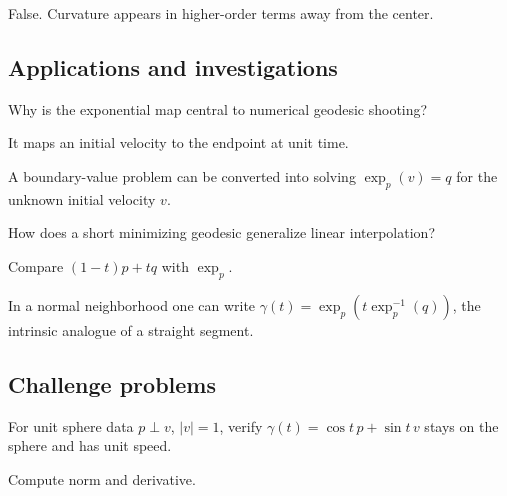 \begin{solution}
False.  Curvature appears in higher-order terms away from the center.
\end{solution}

\subsection*{Applications and investigations}

\begin{exercise}\label{exr:vii23-ped-13}
Why is the exponential map central to numerical geodesic shooting?
\end{exercise}

\begin{hint}
It maps an initial velocity to the endpoint at unit time.
\end{hint}

\begin{solution}
A boundary-value problem can be converted into solving \(\exp_p(v)=q\) for the unknown initial velocity \(v\).
\end{solution}

\begin{exercise}\label{exr:vii23-ped-14}
How does a short minimizing geodesic generalize linear interpolation?
\end{exercise}

\begin{hint}
Compare \((1-t)p+tq\) with \(\exp_p\).
\end{hint}

\begin{solution}
In a normal neighborhood one can write \(\gamma(t)=\exp_p(t\exp_p^{-1}(q))\), the intrinsic analogue of a straight segment.
\end{solution}

\subsection*{Challenge problems}

\begin{exercise}\label{exr:vii23-ped-15}
For unit sphere data \(p\perp v\), \(|v|=1\), verify \(\gamma(t)=\cos t\,p+\sin t\,v\) stays on the sphere and has unit speed.
\end{exercise}

\begin{hint}
Compute norm and derivative.
\end{hint}

